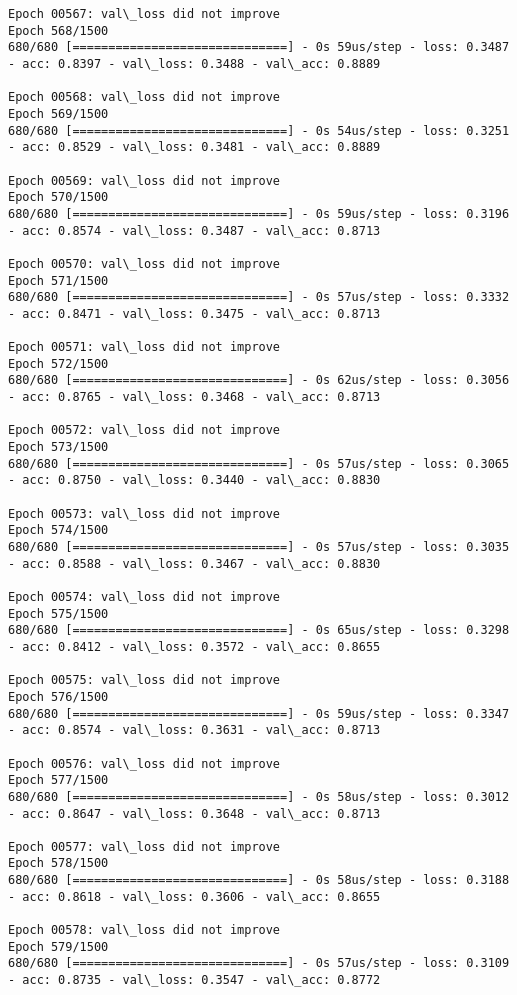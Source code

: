 \documentclass[11pt]{article}
\begin{document}
\begin{Verbatim}[commandchars=\\\{\}]
Epoch 00567: val\_loss did not improve
Epoch 568/1500
680/680 [==============================] - 0s 59us/step - loss: 0.3487 - acc: 0.8397 - val\_loss: 0.3488 - val\_acc: 0.8889

Epoch 00568: val\_loss did not improve
Epoch 569/1500
680/680 [==============================] - 0s 54us/step - loss: 0.3251 - acc: 0.8529 - val\_loss: 0.3481 - val\_acc: 0.8889

Epoch 00569: val\_loss did not improve
Epoch 570/1500
680/680 [==============================] - 0s 59us/step - loss: 0.3196 - acc: 0.8574 - val\_loss: 0.3487 - val\_acc: 0.8713

Epoch 00570: val\_loss did not improve
Epoch 571/1500
680/680 [==============================] - 0s 57us/step - loss: 0.3332 - acc: 0.8471 - val\_loss: 0.3475 - val\_acc: 0.8713

Epoch 00571: val\_loss did not improve
Epoch 572/1500
680/680 [==============================] - 0s 62us/step - loss: 0.3056 - acc: 0.8765 - val\_loss: 0.3468 - val\_acc: 0.8713

Epoch 00572: val\_loss did not improve
Epoch 573/1500
680/680 [==============================] - 0s 57us/step - loss: 0.3065 - acc: 0.8750 - val\_loss: 0.3440 - val\_acc: 0.8830

Epoch 00573: val\_loss did not improve
Epoch 574/1500
680/680 [==============================] - 0s 57us/step - loss: 0.3035 - acc: 0.8588 - val\_loss: 0.3467 - val\_acc: 0.8830

Epoch 00574: val\_loss did not improve
Epoch 575/1500
680/680 [==============================] - 0s 65us/step - loss: 0.3298 - acc: 0.8412 - val\_loss: 0.3572 - val\_acc: 0.8655

Epoch 00575: val\_loss did not improve
Epoch 576/1500
680/680 [==============================] - 0s 59us/step - loss: 0.3347 - acc: 0.8574 - val\_loss: 0.3631 - val\_acc: 0.8713

Epoch 00576: val\_loss did not improve
Epoch 577/1500
680/680 [==============================] - 0s 58us/step - loss: 0.3012 - acc: 0.8647 - val\_loss: 0.3648 - val\_acc: 0.8713

Epoch 00577: val\_loss did not improve
Epoch 578/1500
680/680 [==============================] - 0s 58us/step - loss: 0.3188 - acc: 0.8618 - val\_loss: 0.3606 - val\_acc: 0.8655

Epoch 00578: val\_loss did not improve
Epoch 579/1500
680/680 [==============================] - 0s 57us/step - loss: 0.3109 - acc: 0.8735 - val\_loss: 0.3547 - val\_acc: 0.8772


\end{Verbatim}
\end{document}
